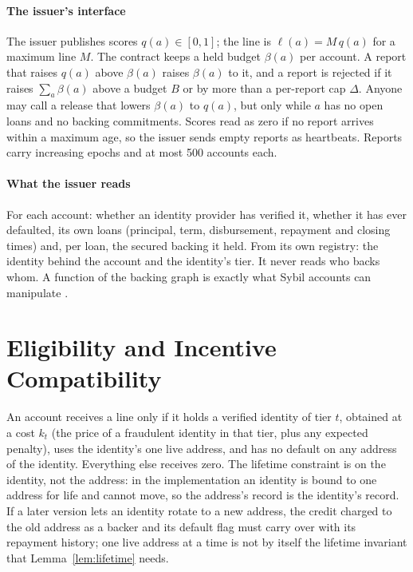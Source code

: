 \documentclass[preprint,11pt,authoryear]{elsarticle}
\begin{document}
\paragraph{The issuer's interface} The issuer publishes scores $q(a)\in[0,1]$; the line is
$\ell(a)=M\,q(a)$ for a maximum line $M$. The contract keeps a held budget $\beta(a)$ per account.
A report that raises $q(a)$ above $\beta(a)$ raises $\beta(a)$ to it, and a report is rejected if
it raises $\sum_a\beta(a)$ above a budget $B$ or by more than a per-report cap $\Delta$. Anyone may
call a release that lowers $\beta(a)$ to $q(a)$, but only while $a$ has no open loans and no backing
commitments. Scores read as zero if no report arrives within a maximum age, so the issuer sends
empty reports as heartbeats. Reports carry increasing epochs and at most 500 accounts each.

\paragraph{What the issuer reads} For each account: whether an identity provider has verified it,
whether it has ever defaulted, its own loans (principal, term, disbursement, repayment and closing
times) and, per loan, the secured backing it held. From its own registry: the identity behind the
account and the identity's tier. It never reads who backs whom. A function of the backing graph is
exactly what Sybil accounts can manipulate \citep{cheng2005sybilproof}.

\section{Eligibility and Incentive Compatibility}\label{sec:ic}

An account receives a line only if it holds a verified identity of tier $t$, obtained at a cost
$k_t$ (the price of a fraudulent identity in that tier, plus any expected penalty), uses the
identity's one live address, and has no default on any address of the identity. Everything else
receives zero. The lifetime constraint is on the identity, not the address: in the implementation an
identity is bound to one address for life and cannot move, so the address's record is the identity's
record. If a later version lets an identity rotate to a new address, the credit charged to the old
address as a backer and its default flag must carry over with its repayment history; one live address
at a time is not by itself the lifetime invariant that Lemma~\ref{lem:lifetime} needs.
\end{document}

